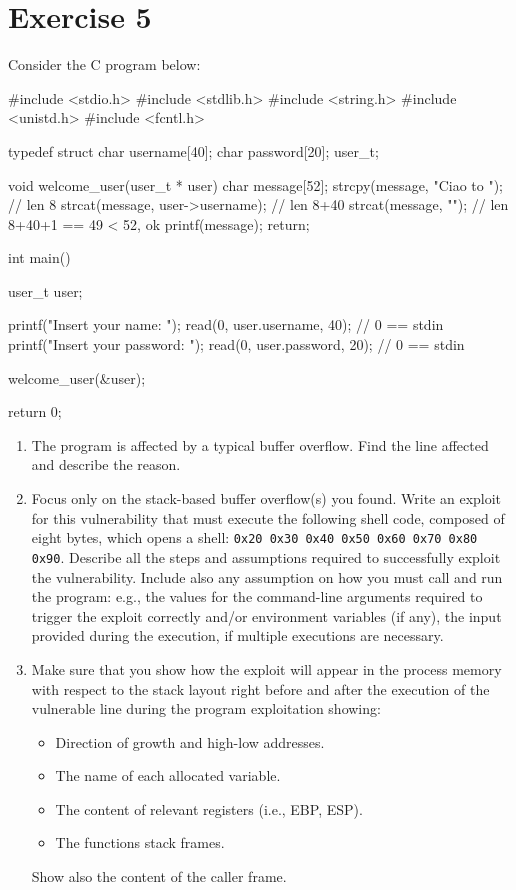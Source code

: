 \section{Exercise 5}

Consider the C program below:
\begin{verbnobox}[\verbarg]
#include <stdio.h>
#include <stdlib.h>
#include <string.h>
#include <unistd.h>
#include <fcntl.h>

typedef struct {
    char username[40];
    char password[20];
} user_t;

void welcome_user(user_t * user){
    char message[52];
    strcpy(message, "Ciao to "); // len 8
    strcat(message, user->username); // len 8+40
    strcat(message, "\n"); // len 8+40+1 == 49 < 52, ok
    printf(message);
    return;
}

int main() {
    user_t user;

    printf("Insert your name: ");
    read(0, user.username, 40); // 0 == stdin
    printf("Insert your password: ");
    read(0, user.password, 20); // 0 == stdin

    welcome_user(&user);

return 0;
}
\end{verbnobox}
\begin{enumerate}
    \item The program is affected by a typical buffer overflow. 
        Find the line affected and describe the reason. 
    \item Focus only on the stack-based buffer overflow(s) you found. 
        Write an exploit for this vulnerability that must execute the following shell code, composed of eight bytes, which opens a shell: \texttt{0x20 0x30 0x40 0x50 0x60 0x70 0x80 0x90}.
        Describe all the steps and assumptions required to successfully exploit the vulnerability. 
        Include also any assumption on how you must call and run the program: e.g., the values for the command-line arguments required to trigger the exploit correctly and/or environment variables (if any), the input provided during the execution, if multiple executions are necessary. 
    \item Make sure that you show how the exploit will appear in the process memory with respect to the stack layout right before and after the execution of the vulnerable line during the program exploitation showing:
    \begin{itemize}
        \item Direction of growth and high-low addresses. 
        \item The name of each allocated variable. 
        \item The content of relevant registers (i.e., EBP, ESP). 
        \item The functions stack frames.
    \end{itemize}
    Show also the content of the caller frame. 
\end{enumerate}

